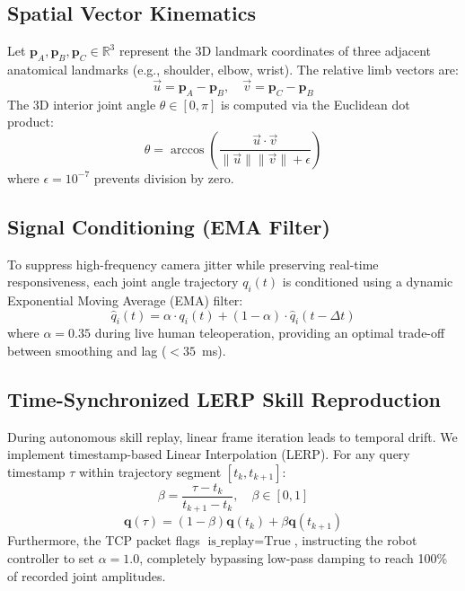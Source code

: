 \documentclass[conference,10pt,twocolumn]{IEEEtran}
\begin{document}
\subsection{Spatial Vector Kinematics}
Let $\mathbf{p}_A, \mathbf{p}_B, \mathbf{p}_C \in \mathbb{R}^3$ represent the 3D landmark coordinates of three adjacent anatomical landmarks (e.g., shoulder, elbow, wrist). The relative limb vectors are:
\begin{equation}
\vec{u} = \mathbf{p}_A - \mathbf{p}_B, \quad \vec{v} = \mathbf{p}_C - \mathbf{p}_B
\end{equation}
The 3D interior joint angle $\theta \in [0, \pi]$ is computed via the Euclidean dot product:
\begin{equation}
\theta = \arccos\left( \frac{\vec{u} \cdot \vec{v}}{\|\vec{u}\| \|\vec{v}\| + \epsilon} \right)
\end{equation}
where $\epsilon = 10^{-7}$ prevents division by zero.

\subsection{Signal Conditioning (EMA Filter)}
To suppress high-frequency camera jitter while preserving real-time responsiveness, each joint angle trajectory $q_i(t)$ is conditioned using a dynamic Exponential Moving Average (EMA) filter:
\begin{equation}
\hat{q}_i(t) = \alpha \cdot q_i(t) + (1 - \alpha) \cdot \hat{q}_i(t - \Delta t)
\end{equation}
where $\alpha = 0.35$ during live human teleoperation, providing an optimal trade-off between smoothing and lag ($< 35$~ms).

\subsection{Time-Synchronized LERP Skill Reproduction}
During autonomous skill replay, linear frame iteration leads to temporal drift. We implement timestamp-based Linear Interpolation (LERP). For any query timestamp $\tau$ within trajectory segment $[t_k, t_{k+1}]$:
\begin{equation}
\beta = \frac{\tau - t_k}{t_{k+1} - t_k}, \quad \beta \in [0, 1]
\end{equation}
\begin{equation}
\mathbf{q}(\tau) = (1 - \beta) \mathbf{q}(t_k) + \beta \mathbf{q}(t_{k+1})
\end{equation}
Furthermore, the TCP packet flags $\text{is\_replay} = \text{True}$, instructing the robot controller to set $\alpha = 1.0$, completely bypassing low-pass damping to reach 100\% of recorded joint amplitudes.
\end{document}
